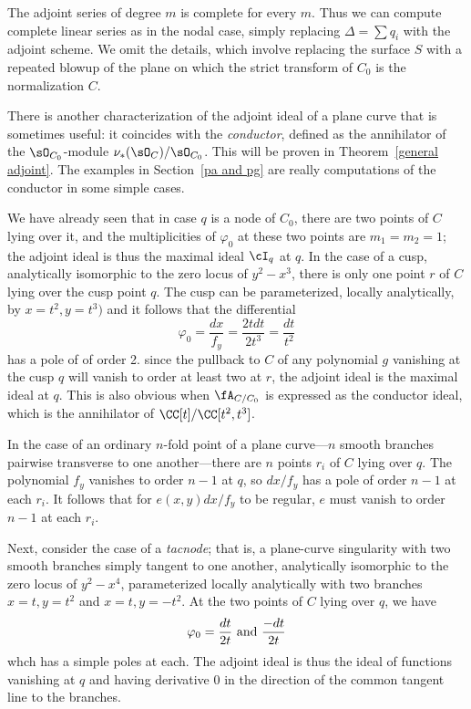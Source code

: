 \begin{fact}
 The adjoint series of degree $m$ is complete for every $m$. Thus  we can compute complete linear series as in the nodal case, simply replacing
$\Delta = \sum q_i$ with the adjoint scheme. We omit the details, which involve replacing
the surface $S$ with a repeated blowup of the plane on which the strict transform of $C_0$ is the normalization $C$.
\end{fact}

There is another characterization of the adjoint ideal of a plane curve that is sometimes useful: it coincides
with the \emph{conductor}, defined as the annihilator of the $\sO_{C_{0}}$-module $\nu_{*}(\sO_{C})/\sO_{C_{0}}$.
This will be proven in Theorem~\ref{general adjoint}. 
The examples in Section~\ref{pa and pg} are
really computations of the conductor in some simple cases.


\begin{example}
We have already seen that in case $q$ is a node of $C_0$, there are two points of $C$ lying over it, and the multiplicities of $\varphi_0$ at these two points are $m_1=m_2=1$; the adjoint ideal is thus 
 the maximal ideal $\cI_q$ at $q$. In the case of a cusp, analytically isomorphic to the zero locus of $y^2-x^3$, there is only one point $r$ of $C$ lying over the cusp point $q$. The cusp can be parameterized, locally analytically,
 by $x = t^{2}, y = t^{3})$ and it follows that the differential 
 $$
 \varphi_0 = \frac{dx}{f_{y}} =  \frac{2tdt}{2t^{3}} =  \frac{dt}{t^{2}}
 $$ 
 has a pole of of order 2. since the pullback to $C$ of any polynomial $g$ vanishing at the cusp $q$ will vanish to order at least two at $r$, the adjoint ideal is the maximal ideal at $q$. This is also obvious when
 $\fA_{C/C_{0}}$ is expressed as the
 conductor ideal, which is the annihilator of $\CC[t]/\CC[t^{2}, t^{3}]$.
\end{example}

\begin{example}
In the case of an ordinary $n$-fold point of a plane curve---$n$ smooth branches pairwise transverse to one another---there are $n$ points
$r_i$ of $C$ lying over $q$. The polynomial $f_y$ vanishes to order $n-1$ at $q$, so $dx/f_y$ has a pole of order $n-1$ at
each $r_i$. It follows that for $e(x,y)dx/f_y$ to be regular, $e$ must vanish to order $n-1$ at each $r_i$. 
 \end{example}

\begin{example}[tacnodes]
Next, consider the case of a \emph{tacnode}; that is, a plane-curve singularity with two smooth branches simply tangent to one another, analytically isomorphic to the zero locus of $y^2-x^4$, parameterized locally analytically with two branches $x = t, y =  t^{2}$ and $x=t, y = -t^{2}$.
At the two points of $C$ lying over $q$, we have
  $$
 \varphi_0 =  \frac{dt}{ 2t} \hbox{ and } \frac{-dt}{ 2t}
 $$ 
whch has a simple poles at each. 
The adjoint ideal is thus the ideal of functions vanishing at $q$ and having derivative 0 in the direction of the common tangent line to the branches.
\end{example}

